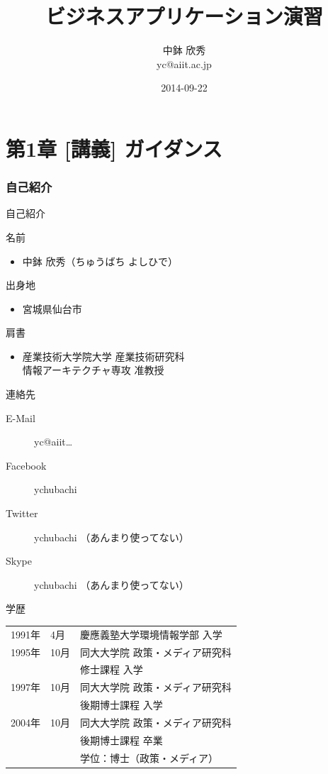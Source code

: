 \documentclass[12pt, t, aspectratio=169]{beamer}
\date{\insertpart}
\institute[AIIT]{産業技術大学院大学(AIIT)}
\author{中鉢 欣秀 \\ yc@aiit.ac.jp}
\date{2014-09-22}
\title{ビジネスアプリケーション演習}
\begin{document}
\maketitle

\part{第1章 [講義] ガイダンス}
\label{sec-1}
\section{自己紹介}
\label{sec-1-1}
\begin{frame}[label=sec-1-1-1]{自己紹介}
\begin{block}{名前}
\begin{itemize}
\item 中鉢 欣秀（ちゅうばち よしひで）
\end{itemize}
\end{block}
\begin{block}{出身地}
\begin{itemize}
\item 宮城県仙台市
\end{itemize}
\end{block}
\begin{block}{肩書}
\begin{itemize}
\item 産業技術大学院大学 産業技術研究科 \\ 情報アーキテクチャ専攻 准教授
\end{itemize}
\end{block}
\end{frame}
\begin{frame}[label=sec-1-1-2]{連絡先}
\begin{description}
\item[{E-Mail}] yc@aiit\ldots{}
\item[{Facebook}] ychubachi
\item[{Twitter}] ychubachi （あんまり使ってない）
\item[{Skype}] ychubachi （あんまり使ってない）
\end{description}
\end{frame}
\begin{frame}[label=sec-1-1-3]{学歴}
\begin{center}
\begin{tabular}{lll}
1991年 & 4月 & 慶應義塾大学環境情報学部 入学\\
1995年 & \alert{10月} & 同大大学院 政策・メディア研究科\\
 &  & 修士課程 入学\\
1997年 & 10月 & 同大大学院 政策・メディア研究科\\
 &  & 後期博士課程 入学\\
2004年 & 10月 & 同大大学院 政策・メディア研究科\\
 &  & 後期博士課程 卒業\\
 &  & 学位：博士（政策・メディア）\\
\end{tabular}
\end{center}
\end{frame}
\end{document}
